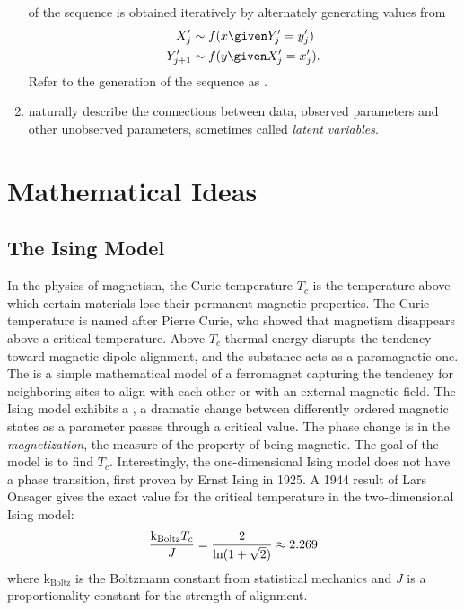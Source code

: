 \documentclass[12pt]{article}
\newcommand{\kT}{{\text k}_{\text{Boltz}}T}
\begin{document}
\begin{enumerate}
        of the sequence is obtained iteratively by alternately
        generating values from
        \begin{align*}
            X'_j &\sim f(x \given Y'_j = y'_j) \\
            Y'_{j+1} &\sim f(y \given X'_j = x'_j).  \\
        \end{align*}
        Refer to the generation of the sequence as .
    \item
         naturally describe the
        connections between data, observed parameters and other
        unobserved parameters, sometimes called \emph{latent variables}.
\end{enumerate}

\hr

\section*{Mathematical Ideas}
\subsection*{The Ising Model}

In the physics of magnetism, the Curie temperature \( T_c \)%
is the temperature above which certain materials lose their permanent
magnetic properties.  The Curie temperature is named after Pierre Curie,
who showed that magnetism disappears above a critical temperature. Above
\( T_c \) thermal energy disrupts the tendency toward magnetic dipole
alignment, and the substance acts as a paramagnetic one.  The %
is a simple mathematical model of a ferromagnet capturing the tendency
for neighboring sites to align with each other or with an external
magnetic field.  The Ising model exhibits a ,%
a dramatic change between differently ordered magnetic states
as a parameter passes through a critical value.  The
phase change is in the \emph{magnetization},%
the measure of the property of being magnetic.  The goal of the model is
to find \( T_c \).  Interestingly, the one-dimensional Ising model does
not have a phase transition, first proven by Ernst Ising in 1925.  A
1944 result of Lars Onsager gives the exact value for the critical
temperature in the two-dimensional Ising model:
\[
    \frac{\kT_c}{J} = \frac{2}{\ln(1 + \sqrt{2})} \approx 2.269
\] where \( \text{k}_{\text{Boltz}} \) is the Boltzmann constant from statistical mechanics
and \( J \) is a proportionality constant for the strength of alignment.
\end{document}
